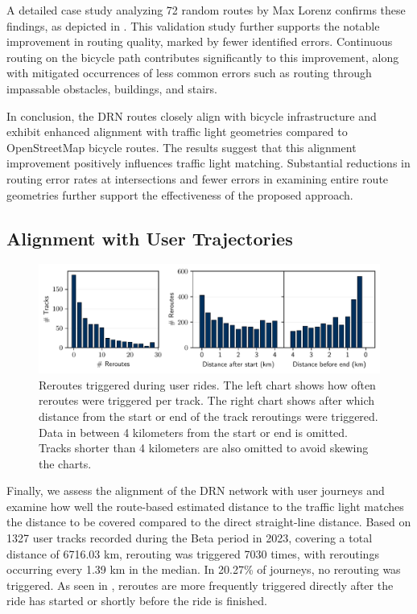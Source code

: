 A detailed case study analyzing 72 random routes by Max Lorenz \cite{lorenz_2022} confirms these findings, as depicted in . This validation study further supports the notable improvement in routing quality, marked by fewer identified errors. Continuous routing on the bicycle path contributes significantly to this improvement, along with mitigated occurrences of less common errors such as routing through impassable obstacles, buildings, and stairs.

In conclusion, the DRN routes closely align with bicycle infrastructure and exhibit enhanced alignment with traffic light geometries compared to OpenStreetMap bicycle routes. The results suggest that this alignment improvement positively influences traffic light matching. Substantial reductions in routing error rates at intersections and fewer errors in examining entire route geometries further support the effectiveness of the proposed approach.

\subsection{Alignment with User Trajectories}

\begin{figure}[t]
\centering 
\includegraphics[width=\linewidth]{images/routing-reroutes-distribution.pdf}
\caption{Reroutes triggered during user rides. The left chart shows how often reroutes were triggered per track. The right chart shows after which distance from the start or end of the track reroutings were triggered. Data in between 4 kilometers from the start or end is omitted. Tracks shorter than 4 kilometers are also omitted to avoid skewing the charts.}
\label{fig:routing-reroutes-distribution}
\end{figure}

Finally, we assess the alignment of the DRN network with user journeys and examine how well the route-based estimated distance to the traffic light matches the distance to be covered compared to the direct straight-line distance. Based on 1327 user tracks recorded during the Beta period in 2023, covering a total distance of 6716.03 km, rerouting was triggered 7030 times, with reroutings occurring every 1.39 km in the median. In 20.27\% of journeys, no rerouting was triggered. As seen in , reroutes are more frequently triggered directly after the ride has started or shortly before the ride is finished. 

